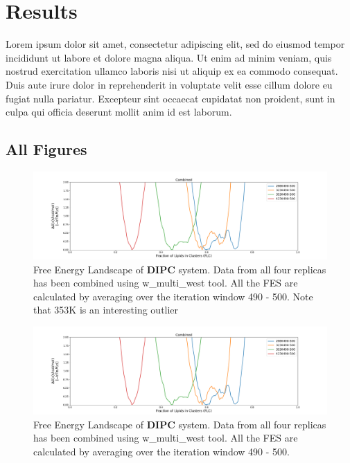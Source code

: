 \documentclass{biophys-new}
\begin{document}
\section*{Results}

Lorem ipsum dolor sit amet, consectetur adipiscing elit, sed do eiusmod tempor incididunt ut labore et dolore magna aliqua. Ut enim ad minim veniam, quis nostrud exercitation ullamco laboris nisi ut aliquip ex ea commodo consequat. Duis aute irure dolor in reprehenderit in voluptate velit esse cillum dolore eu fugiat nulla pariatur. Excepteur sint occaecat cupidatat non proident, sunt in culpa qui officia deserunt mollit anim id est laborum.

\subsection*{All Figures}

\begin{figure}[hbt!]
\centering
\includegraphics[width=1.1\linewidth]{all_plots/ClusterLipids2Total/DPPC_DIPC_CHOL/Average_DIPC_MULTI__ClusterLipids2Total.png}
\caption{Free Energy Landscape of \textbf{DIPC} system. Data from all four replicas has been combined using w\_multi\_west tool. All the FES are calculated by averaging over the iteration window 490 - 500. Note that 353K is an interesting outlier}
\label{fig:view}

\end{figure}

\begin{figure}[hbt!]
\centering
\includegraphics[width=1.1\linewidth]{all_plots/ClusterLipids2Total/DPPC_DIPC_CHOL/Average_DIPC_MULTI__ClusterLipids2Total.png}
\caption{Free Energy Landscape of \textbf{DIPC} system. Data from all four replicas has been combined using w\_multi\_west tool. All the FES are calculated by averaging over the iteration window 490 - 500.}
\label{fig:view}

\end{figure}
\end{document}
